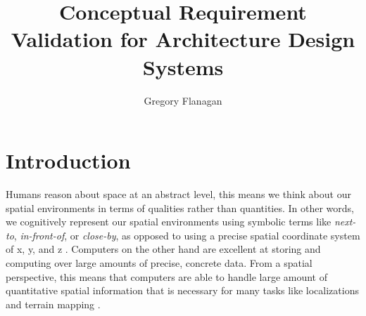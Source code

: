 \documentclass[12pt]{ucthesis}
\begin{document}

\title{Conceptual Requirement Validation for Architecture Design Systems}
\author{Gregory Flanagan}
  
 
     



\maketitle

\begin{frontmatter}

\copyrightpage

\committeemembershippage

\begin{abstract}
 



\end{abstract}





\tableofcontents


\listoftables

\listoffigures

\end{frontmatter}

\pagestyle{plain}




\renewcommand{\baselinestretch}{1.66}







\chapter{Introduction}
\label{intro}
Humans reason about space at an abstract level, this means we think about our spatial environments in terms of qualities rather than quantities. In other words, we cognitively represent our spatial environments using symbolic terms like \emph{next-to}, \emph{in-front-of}, or \emph{close-by}, as opposed to using a precise spatial coordinate system of x, y, and z  \cite{freksa1991qsr} \cite{Cohn:2001:QSR}. Computers on the other hand are excellent at storing and computing over large amounts of precise, concrete data. From a spatial perspective, this means that computers are able to handle large amount of quantitative spatial information that is necessary for many tasks like localizations and terrain mapping \cite{somebody}. 
\end{document}
